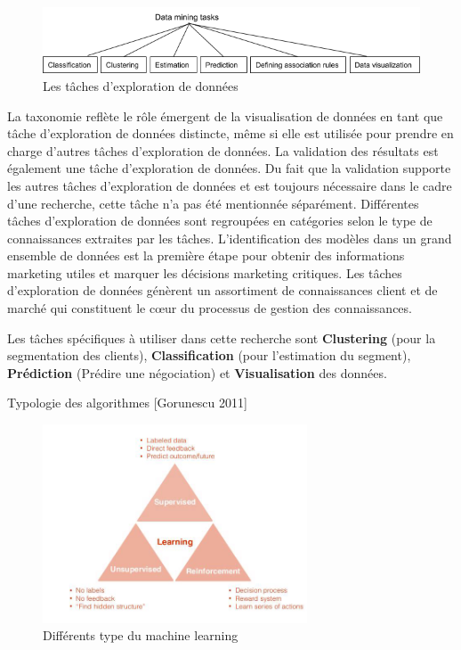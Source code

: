 \documentclass[12pt]{article}
\begin{document}
{%

\begin{figure}[H]
	\centering
    \includegraphics[width=1\textwidth]{image2.png}
     \caption{ Les tâches d'exploration de données }
    \label{fig:2}
\end{figure}


La taxonomie reflète le rôle émergent de la visualisation de données en tant que tâche d'exploration de données distincte, même si elle est utilisée pour prendre en charge d'autres tâches d'exploration de données. 
La validation des résultats est également une tâche d'exploration de données. Du fait que la validation supporte les autres tâches d'exploration de données et est toujours nécessaire dans le cadre d'une recherche, cette tâche n'a pas été mentionnée séparément. 
Différentes tâches d'exploration de données sont regroupées en catégories selon le type de connaissances extraites par les tâches. 
L'identification des modèles dans un grand ensemble de données est la première étape pour obtenir des informations marketing utiles et marquer les décisions marketing critiques. Les tâches d'exploration de données génèrent un assortiment de connaissances client et de marché qui constituent le cœur du processus de gestion des connaissances.

Les tâches spécifiques à utiliser dans cette recherche sont \textbf{Clustering} (pour la segmentation des clients), \textbf{Classification} (pour l'estimation du segment), \textbf{Prédiction} (Prédire une négociation) et \textbf{Visualisation} des données.

Typologie des algorithmes {\color{red}[Gorunescu 2011] }



\begin{figure}[H]
	\centering
    \includegraphics[width=0.7\textwidth]{image3.png}
     \caption{Différents type du machine learning}
    \label{fig:3}
\end{figure}

}
\end{document}
